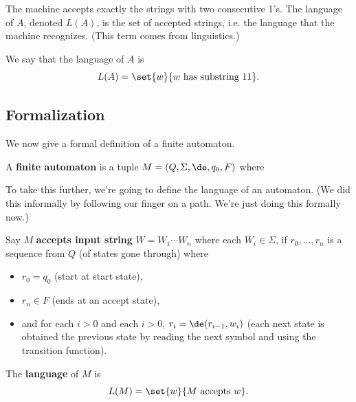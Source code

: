 \vskip0.15in
The machine accepts exactly the strings with two consecutive 1's. 
The language of $A$, denoted $L(A)$, is the set of accepted strings, i.e. the language that the machine recognizes.
(This term comes from linguistics.)

We say that the language of $A$ is
\[
L(A)=\set{w}{w\text{ has substring }11}.
\]

\subsection{Formalization}

We now give a formal definition of a finite automaton.

\begin{df}
A \textbf{finite automaton} is a tuple $M=(Q,\Sigma,\de,q_0,F)$ where
\end{df}
To take this further, we're going to define the language of an automaton. (We did this informally by following our finger on a path. We're just doing this formally now.)
\begin{df}
Say $M$ \textbf{accepts input string} $W=W_1\cdots W_n$ where each $W_i\in \Sigma$, if $r_0,\ldots, r_n$ is a sequence from $Q$ (of states gone through) where 
\begin{itemize}
\item
$r_0=q_0$ (start at start state),
\item
$r_n\in F$ (ends at an accept state),
\item
and for each $i>0$ and each $i>0$, $r_i=\de(r_{i-1},w_i)$ (each next state is obtained the previous state by reading the next symbol and using the transition function).
\end{itemize}
The \textbf{language} of $M$ is
\[
L(M)=\set{w}{M\text{ accepts }w}.
\]
\end{df}


